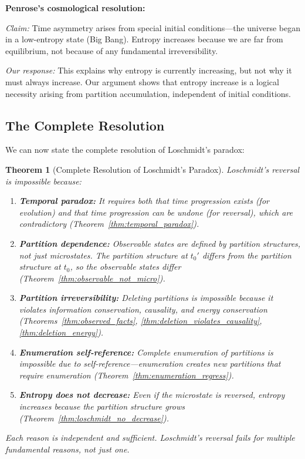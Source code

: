 \documentclass[twocolumn,10pt]{article}
\newtheorem{theorem}{Theorem}[section]
\theoremstyle{definition}
\theoremstyle{remark}
\begin{document}
\vspace{0.2cm}
\noindent\textbf{Penrose's cosmological resolution\cite{penrose1989}:}

\textit{Claim:} Time asymmetry arises from special initial conditions—the universe began in a low-entropy state (Big Bang). Entropy increases because we are far from equilibrium, not because of any fundamental irreversibility.

\textit{Our response:} This explains why entropy is currently increasing, but not why it must always increase. Our argument shows that entropy increase is a logical necessity arising from partition accumulation, independent of initial conditions.

\subsection{The Complete Resolution}

We can now state the complete resolution of Loschmidt's paradox:

\begin{theorem}[Complete Resolution of Loschmidt's Paradox]
\label{thm:complete_resolution}
Loschmidt's reversal is impossible because:
\begin{enumerate}
\item \textbf{Temporal paradox:} It requires both that time progression exists (for evolution) and that time progression can be undone (for reversal), which are contradictory (Theorem~\ref{thm:temporal_paradox}).

\item \textbf{Partition dependence:} Observable states are defined by partition structures, not just microstates. The partition structure at $t_0'$ differs from the partition structure at $t_0$, so the observable states differ (Theorem~\ref{thm:observable_not_micro}).

\item \textbf{Partition irreversibility:} Deleting partitions is impossible because it violates information conservation, causality, and energy conservation (Theorems~\ref{thm:observed_facts}, \ref{thm:deletion_violates_causality}, \ref{thm:deletion_energy}).

\item \textbf{Enumeration self-reference:} Complete enumeration of partitions is impossible due to self-reference—enumeration creates new partitions that require enumeration (Theorem~\ref{thm:enumeration_regress}).

\item \textbf{Entropy does not decrease:} Even if the microstate is reversed, entropy increases because the partition structure grows (Theorem~\ref{thm:loschmidt_no_decrease}).
\end{enumerate}

Each reason is independent and sufficient. Loschmidt's reversal fails for multiple fundamental reasons, not just one.
\end{theorem}
\end{document}
